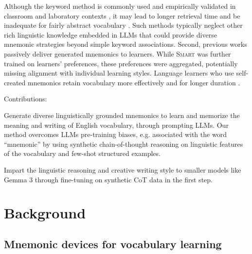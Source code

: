 \documentclass[11pt]{article}
\begin{document}
Although the keyword method is commonly used and empirically validated in classroom and laboratory contexts \citetext{\citealp{atkinsonApplicationMnemonicKeyword1975}, \citealp{pressleyMnemonicKeywordMethod1982}}, it may lead to longer retrieval time \citep{vanhellKeywordMnemonicsRote1997} and be inadequate for fairly abstract vocabulary \citetext{\citealp{camposLimitationsMnemonicKeywordMethod2003}, \citealp{camposImportanceKeywordGenerationMethod2004a}}. Such methods typically neglect other rich linguistic knowledge embedded in LLMs that could provide diverse mnemonic strategies beyond simple keyword associations. Second, previous works passively deliver generated mnemonics to learners. While \textsc{Smart} \citep{balepurSMART2024} was further trained on learners' preferences, these preferences were aggregated, potentially missing alignment with individual learning styles. Language learners who use self-created mnemonics retain vocabulary more effectively and for longer duration \citep{madanExploringWordMemorability2021}.


Contributions:

Generate diverse linguistically grounded mnemonics to learn and memorize the meaning and writing of English vocabulary, through prompting LLMs. Our method overcomes LLMs pre-training biases, e.g. associated with the word “mnemonic” by using synthetic chain-of-thought reasoning on linguistic features of the vocabulary and few-shot structured examples.

Impart the linguistic reasoning and creative writing style to smaller models like Gemma 3 through fine-tuning on synthetic CoT data in the first step.

\section{Background}
\subsection{Mnemonic devices for vocabulary learning}
\end{document}
